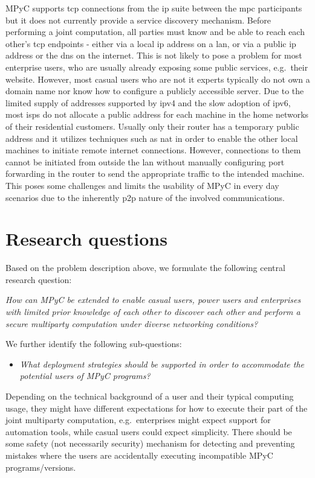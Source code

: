 MPyC supports \gls{tcp} connections from the \gls{ip} suite between the
\gls{mpc} participants but it does not currently provide a service
discovery mechanism. Before performing a joint computation, all parties
must know and be able to reach each other's \gls{tcp} endpoints - either
via a local \gls{ip} address on a \gls{lan}, or via a public \gls{ip}
address or the \gls{dns} on the internet. This is not likely to pose a
problem for most enterprise users, who are usually already exposing some
public services, e.g.~their website. However, most casual users who are
not \gls{it} experts typically do not own a domain name nor know how to
configure a publicly accessible server. Due to the limited supply of
addresses supported by \gls{ip}v4 and the slow adoption of \gls{ip}v6,
most \glspl{isp} do not allocate a public address for each machine in
the home networks of their residential customers. Usually only their
router has a temporary public address and it utilizes techniques such as
\gls{nat} in order to enable the other local machines to initiate remote
internet connections. However, connections to them cannot be initiated
from outside the \gls{lan} without manually configuring port forwarding
in the router to send the appropriate traffic to the intended machine.
This poses some challenges and limits the usability of MPyC in every day
scenarios due to the inherently \gls{p2p} nature of the involved
communications.

\hypertarget{research-questions}{%
\section{Research questions}\label{research-questions}}

Based on the problem description above, we formulate the following
central research question:

\emph{How can MPyC be extended to enable casual users, power users and
enterprises with limited prior knowledge of each other to discover each
other and perform a secure multiparty computation under diverse
networking conditions?}

We further identify the following sub-questions:

\begin{itemize}
\tightlist
\item
  \emph{What deployment strategies should be supported in order to
  accommodate the potential users of MPyC programs?}
\end{itemize}

Depending on the technical background of a user and their typical
computing usage, they might have different expectations for how to
execute their part of the joint multiparty computation, e.g.~enterprises
might expect support for automation tools, while casual users could
expect simplicity. There should be some safety (not necessarily
security) mechanism for detecting and preventing mistakes where the
users are accidentally executing incompatible MPyC programs/versions.

